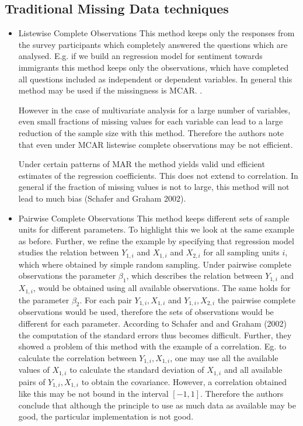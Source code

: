 \subsection{Traditional Missing Data techniques} 
\begin{itemize}
\item Listewise Complete Observations
This method keeps only the responses from the survey participants which completely answered the questions which are analysed.  E.g. if we build an regression model for sentiment towards immigrants this method keeps only the observations, which have completed all questions included as independent or dependent variables. 
In general this method may be used if the missingness is MCAR. .  \par However in the case of multivariate analysis for a large number of variables, even small fractions of missing values for each variable can lead to a large reduction of the sample size with this method. Therefore the authors note that even under MCAR listewise complete observations may be not efficient. \par Under certain patterns of MAR the method yields valid und efficient estimates of the regression coefficients. This does not extend to correlation. In general if the fraction of missing values is not to large, this method will not lead to much bias (Schafer and Graham 2002).  
\item Pairwise Complete Observations 
This method keeps different sets of sample units for different parameters. To highlight this we look at the same example as before. Further, we refine the example by specifying that regression model studies the relation between $Y_{1,i}$ and $X_{1,i}$ and $X_{2,i}$ for all sampling units $i$, which where obtained by simple random sampling. Under pairwise complete observations the parameter $\beta_1$, which describes the relation between  $Y_{1,i}$ and $X_{1,i}$, would be obtained using all available observations. The same holds for the parameter $\beta_2$. For each pair $Y_{1,i} , X_{1,i}$  and  $Y_{1,i} , X_{2,i}$ the pairwise complete observations would be used, therefore the sets of observations would be different for each parameter. According to Schafer and and Graham (2002) the computation of the standard errors thus becomes difficult. Further,  they showed a problem of this method with the example of a correlation. Eg. to calculate the correlation between $Y_{1,i} , X_{1,i}$, one may use all the available values of $X_{1,i}$ to calculate the standard deviation of $X_{1,i}$ and all available pairs of $Y_{1,i} , X_{1,i}$ to obtain the covariance. However, a correlation obtained like this may be not bound in the interval $[-1,1]$. Therefore the authors conclude that although the principle to use as much data as available may be good, the particular implementation is not good.

\end{itemize}
